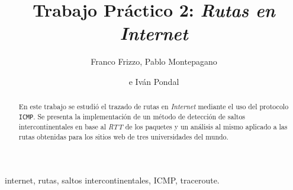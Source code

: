 \documentclass[%
    final,
    notitlepage,
    narroweqnarray,
    inline,
    twoside,
]{ieee}
\begin{document}
\title[Trabajo Práctico 2: Rutas en Internet]{%
       Trabajo Práctico 2: \emph{Rutas en Internet}}

\author[FRIZZO, MONTEPAGANO, PONDAL]{Franco Frizzo, Pablo Montepagano
\and{}e Iván Pondal}


\maketitle

\begin{abstract}
    En este trabajo se estudió el trazado de rutas en \emph{Internet} mediante el uso
    del protocolo \texttt{ICMP}. Se presenta la implementación de un método de
    detección de saltos intercontinentales en base al \emph{RTT} de los paquetes y
    un análisis al mismo aplicado a las rutas obtenidas para los sitios web de
    tres universidades del mundo.
\end{abstract}

\begin{keywords}
internet, rutas, saltos intercontinentales, ICMP, traceroute.
\end{keywords}








\end{document}
